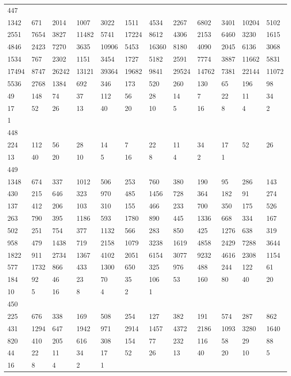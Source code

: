 \begin{longtable}{llllllllllll}
447&&&&&&&&&&&\\
1342& 671& 2014& 1007& 3022& 1511& 4534& 2267& 6802& 3401& 10204& 5102\\
2551& 7654& 3827& 11482& 5741& 17224& 8612& 4306& 2153& 6460& 3230& 1615\\
4846& 2423& 7270& 3635& 10906& 5453& 16360& 8180& 4090& 2045& 6136& 3068\\
1534& 767& 2302& 1151& 3454& 1727& 5182& 2591& 7774& 3887& 11662& 5831\\
17494& 8747& 26242& 13121& 39364& 19682& 9841& 29524& 14762& 7381& 22144& 11072\\
5536& 2768& 1384& 692& 346& 173& 520& 260& 130& 65& 196& 98\\
49& 148& 74& 37& 112& 56& 28& 14& 7& 22& 11& 34\\
17& 52& 26& 13& 40& 20& 10& 5& 16& 8& 4& 2\\
1& \\

448&&&&&&&&&&&\\
224& 112& 56& 28& 14& 7& 22& 11& 34& 17& 52& 26\\
13& 40& 20& 10& 5& 16& 8& 4& 2& 1& \\

449&&&&&&&&&&&\\
1348& 674& 337& 1012& 506& 253& 760& 380& 190& 95& 286& 143\\
430& 215& 646& 323& 970& 485& 1456& 728& 364& 182& 91& 274\\
137& 412& 206& 103& 310& 155& 466& 233& 700& 350& 175& 526\\
263& 790& 395& 1186& 593& 1780& 890& 445& 1336& 668& 334& 167\\
502& 251& 754& 377& 1132& 566& 283& 850& 425& 1276& 638& 319\\
958& 479& 1438& 719& 2158& 1079& 3238& 1619& 4858& 2429& 7288& 3644\\
1822& 911& 2734& 1367& 4102& 2051& 6154& 3077& 9232& 4616& 2308& 1154\\
577& 1732& 866& 433& 1300& 650& 325& 976& 488& 244& 122& 61\\
184& 92& 46& 23& 70& 35& 106& 53& 160& 80& 40& 20\\
10& 5& 16& 8& 4& 2& 1& \\

450&&&&&&&&&&&\\
225& 676& 338& 169& 508& 254& 127& 382& 191& 574& 287& 862\\
431& 1294& 647& 1942& 971& 2914& 1457& 4372& 2186& 1093& 3280& 1640\\
820& 410& 205& 616& 308& 154& 77& 232& 116& 58& 29& 88\\
44& 22& 11& 34& 17& 52& 26& 13& 40& 20& 10& 5\\
16& 8& 4& 2& 1& \\


\end{longtable}
